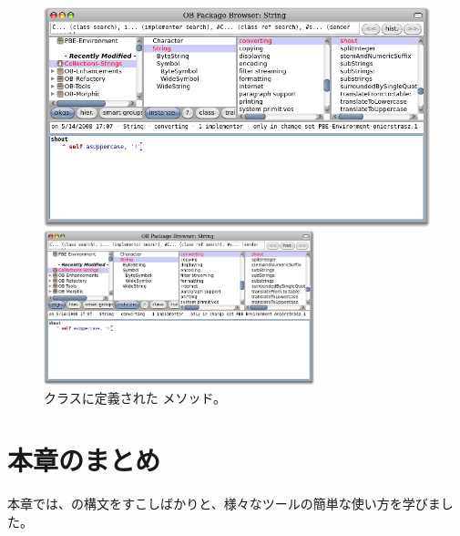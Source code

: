 \documentclass[a4paper,10pt,twoside]{book}
\begin{document}
{{{\begin{figure}[hbt]
\ifluluelse
	{\centerline{\includegraphics[width=\textwidth]{String-Shout}}}
	{\centerline{\includegraphics[width=0.7\textwidth]{String-Shout}}}
\caption{ クラスに定義された  メソッド。
}
\end{figure}

\section{本章のまとめ}
本章では、\pharo の構文をすこしばかりと、様々なツールの簡単な使い方を学びました。

}}}
\end{document}
